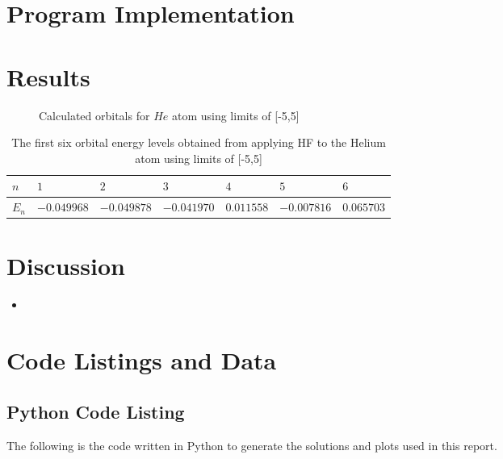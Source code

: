 \documentclass[10pt, oneside, letterpaper]{article}
\begin{document}
\newpage
\section{Program Implementation}


\newpage
\section{Results}

\begin{figure}[H]
  \begin{center}
  \end{center}
  \caption{Calculated orbitals for $He$ atom using limits of [-5,5]}
  \label{he-plot}
\end{figure}

\begin{table}[H]
\begin{center}
\begin{tabular}{l|llllll}\hline
$n$    & $1$    & $2$     & $3$     & $4$      & $5$      & $6$      \\\hline
$E_n$  & $-0.049968$  & $-0.049878$  & $-0.041970$  & $0.011558$  & $-0.007816$  & $0.065703$ \\\hline
\end{tabular}
\end{center}
  \caption{The first six orbital energy levels obtained from applying HF to the Helium atom using limits of [-5,5]}
  \label{orbital-energies-he}
\end{table}

\newpage
\section{Discussion}

\begin{itemize}
    \item 
\end{itemize}

\newpage
\section{Code Listings and Data}

\subsection{Python Code Listing}
\label{code-listing-python}
The following is the code written in Python to generate the solutions and plots used in this report.
% 
\end{document}
